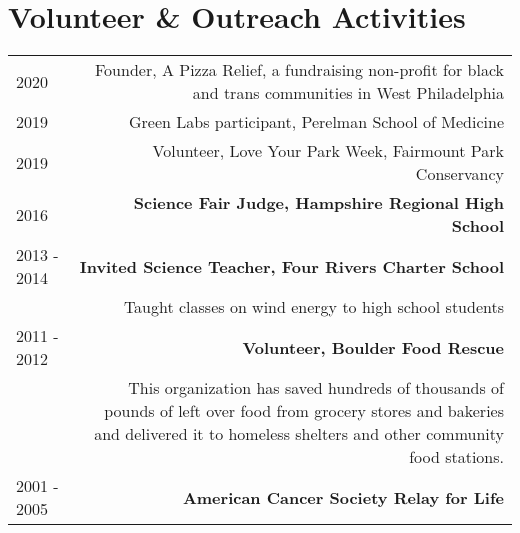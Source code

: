\section*{Volunteer \& Outreach Activities}
\begin{tabular}{L!{\VRule}R}
2020& Founder, A Pizza Relief, a fundraising non-profit for black and trans communities in West Philadelphia\\ 
2019& Green Labs participant, Perelman School of Medicine\\
2019& Volunteer, Love Your Park Week, Fairmount Park Conservancy\\
2016& {\bf Science Fair Judge, Hampshire Regional High School} \\
2013 - 2014& {\bf Invited Science Teacher, Four Rivers Charter School}\\
& Taught classes on wind energy to high school students\\
2011 - 2012& {\bf Volunteer, Boulder Food Rescue}\\
& This organization has saved hundreds of thousands of pounds of left over food from grocery stores and bakeries and delivered it to homeless shelters and other community food stations. \\
2001 - 2005& {\bf American Cancer Society Relay for Life}\\
\end{tabular}
